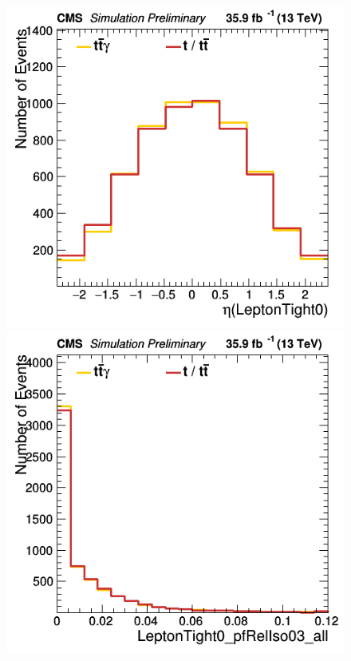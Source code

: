 \documentclass[11pt]{scrartcl}
\begin{document}
	\begin{figure}[H]
	\centering
	\begin{minipage}{.5\textwidth}
	  \centering
	  \includegraphics[width=0.7\linewidth]{figures/Notused/LeptonTight0_eta.png}
	\end{minipage}%
	\begin{minipage}{.5\textwidth}
	  \centering
	  \includegraphics[width=0.7\linewidth]{figures/Notused/LeptonTight0_pfRelIso03_all.png}
	\end{minipage}
	\end{figure}
	
\end{document}

